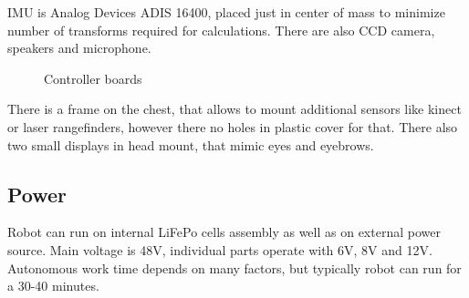 \documentclass[letterpaper, 10 pt, conference]{ieeeconf}  %
\begin{document}
IMU is Analog Devices ADIS 16400, placed just in center of mass to minimize
number of transforms required for calculations. There are also CCD camera,
speakers and microphone.

\begin{figure}[thpb]
\caption{Controller boards}
\label{img:electronics}
\end{figure}  

There is a frame on the chest, that allows to mount additional sensors like
kinect or laser rangefinders, however there no holes in plastic cover for that.
There also two small displays in head mount, that mimic eyes and eyebrows.

\subsection{Power}
Robot can run on internal LiFePo cells assembly as well as on external power
source. Main voltage is 48V, individual parts operate with 6V, 8V and 12V.
Autonomous work time depends on many factors, but typically robot can run for a
30-40 minutes.
 
\end{document}
